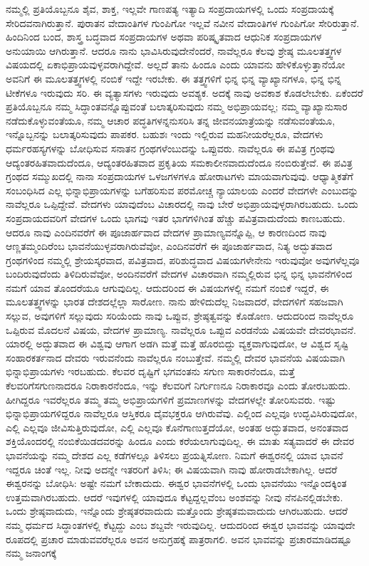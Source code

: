 ನಮ್ಮಲ್ಲಿ ಪ್ರತಿಯೊಬ್ಬನೂ ಶೈವ, ಶಾಕ್ತ, ಇಲ್ಲವೇ ಗಾಣಪತ್ಯ ಇತ್ಯಾದಿ ಸಂಪ್ರದಾಯಗಳಲ್ಲಿ ಒಂದು ಸಂಪ್ರದಾಯಕ್ಕೆ ಸೇರಿದವನಾಗಿರುತ್ತಾನೆ. ಪುರಾತನ ವೇದಾಂತಿಗಳ ಗುಂಪಿಗೋ ಇಲ್ಲವೆ ನವೀನ ವೇದಾಂತಿಗಳ ಗುಂಪಿಗೋ ಸೇರಿರುತ್ತಾನೆ. ಹಿಂದಿನಿಂದ ಬಂದ, ಶಾಸ್ತ್ರ ಬದ್ಧವಾದ ಸಂಪ್ರದಾಯಗಳ ಅಥವಾ ಪರಿಷ್ಕೃತವಾದ ಆಧುನಿಕ ಸಂಪ್ರದಾಯಗಳ ಅನುಯಾಯಿ ಆಗಿರುತ್ತಾನೆ. ಆದರೂ ನಾನು ಭಾವಿಸಿರುವುದೇನೆಂದರೆ, ನಾವೆಲ್ಲರೂ ಕೆಲವು ಶ್ರೇಷ್ಠ ಮೂಲತತ್ತ್ವಗಳ ವಿಷಯದಲ್ಲಿ ಏಕಾಭಿಪ್ರಾಯವುಳ್ಳವರಾಗಿದ್ದೇವೆ. ಅಲ್ಲದೆ ತಾನು ಹಿಂದೂ ಎಂದು ಯಾವನು ಹೇಳಿಕೊಳ್ಳುತ್ತಾನೆಯೋ ಅವನಿಗೆ ಈ ಮೂಲತತ್ತ್ವಗಳಲ್ಲಿ ನಂಬಿಕೆ ಇದ್ದೇ ಇರಬೇಕು. ಈ ತತ್ತ್ವಗಳಿಗೆ ಭಿನ್ನ ಭಿನ್ನ ವ್ಯಾಖ್ಯಾನಗಳೂ, ಭಿನ್ನ ಭಿನ್ನ ಟೀಕೆಗಳೂ ಇರುವುದು ಸರಿ. ಈ ವ್ಯತ್ಯಾಸಗಳು ಇರುವುದು ಅವಶ್ಯಕ. ಅದಕ್ಕೆ ನಾವು ಅವಕಾಶ ಕೊಡಲೇಬೇಕು. ಏಕೆಂದರೆ ಪ್ರತಿಯೊಬ್ಬನೂ ನಮ್ಮ ಸಿದ್ಧಾಂತವನ್ನೊಪ್ಪುವಂತೆ ಬಲಾತ್ಕರಿಸುವುದು ನಮ್ಮ ಅಭಿಪ್ರಾಯವಲ್ಲ; ನಮ್ಮ ವ್ಯಾಖ್ಯಾನುಸಾರ ನಡೆದುಕೊಳ್ಳುವಂತೆಯೂ, ನಮ್ಮ ಆಚಾರ ಪದ್ಧತಿಗಳನ್ನನುಸರಿಸಿ ತನ್ನ ಜೀವನಯಾತ್ರೆಯನ್ನು ನಡೆಸುವಂತೆಯೂ, ಇನ್ನೊಬ್ಬನನ್ನು ಬಲಾತ್ಕರಿಸುವುದು ಪಾಪಕರ. ಬಹುಶಃ ಇಂದು ಇಲ್ಲಿರುವ ಮಹನೀಯರೆಲ್ಲರೂ, ವೇದಗಳು ಧರ್ಮರಹಸ್ಯಗಳನ್ನು ಬೋಧಿಸುವ ಸನಾತನ ಗ್ರಂಥಗಳೆಂಬುದನ್ನು ಒಪ್ಪುವರು. ನಾವೆಲ್ಲರೂ ಈ ಪವಿತ್ರ ಗ್ರಂಥವು ಆದ್ಯಂತರಹಿತವಾದುದೆಂದೂ, ಆದ್ಯಂತರಹಿತವಾದ ಪ್ರಕೃತಿಯ ಸಮಕಾಲೀನವಾದುದೆಂದೂ ನಂಬಿರುತ್ತೇವೆ. ಈ ಪವಿತ್ರ ಗ್ರಂಥದ ಸಮ್ಮುಖದಲ್ಲಿ ನಾನಾ ಸಂಪ್ರದಾಯಗಳ ಒಳಜಗಳಗಳೂ ಹೋರಾಟಗಳು ಮಾಯವಾಗುವುವು. ಆಧ್ಯಾತ್ಮಿಕತೆಗೆ ಸಂಬಂಧಿಸಿದ ಎಲ್ಲ ಭಿನ್ನಾಭಿಪ್ರಾಯಗಳನ್ನು ಬಗೆಹರಿಸುವ ಪರಮೋಚ್ಚ ನ್ಯಾಯಾಲಯ ಎಂದರೆ ವೇದಗಳೇ ಎಂಬುದನ್ನು ನಾವೆಲ್ಲರೂ ಒಪ್ಪಿದ್ದೇವೆ. ವೇದಗಳು ಯಾವುದೆಂಬ ವಿಚಾರದಲ್ಲಿ ನಾವು ಬೇರೆ ಅಭಿಪ್ರಾಯವುಳ್ಳರಾಗಿರಬಹುದು. ಒಂದು ಸಂಪ್ರದಾಯದವರಿಗೆ ವೇದಗಳ ಒಂದು ಭಾಗವು ಇತರ ಭಾಗಗಳಿಗಿಂತ ಹೆಚ್ಚು ಪವಿತ್ರವಾದುದೆಂದು ಕಾಣಬಹುದು. ಆದರೂ ನಾವು ಎಂದಿನವರೆಗೆ ಈ ಪೂಜಾರ್ಹವಾದ ವೇದಗಳ ಪ್ರಾಮಾಣ್ಯವನ್ನೊಪ್ಪಿ, ಆ ಕಾರಣದಿಂದ ನಾವು ಆಣ್ಣತಮ್ಮಂದಿರೆಂಬ ಭಾವನೆಯುಳ್ಳವರಾಗಿರುವೆವೋ, ಎಂದಿನವರೆಗೆ ಈ ಪೂಜಾರ್ಹವಾದ, ನಿತ್ಯ ಅದ್ಭುತವಾದ ಗ್ರಂಥಗಳಿಂದ ನಮ್ಮಲ್ಲಿ ಶ್ರೇಯಸ್ಕರವಾದ, ಪವಿತ್ರವಾದ, ಪರಿಶುದ್ಧವಾದ ವಿಷಯಗಳೇನೇನು ಇರುವುವೋ ಅವುಗಳೆಲ್ಲವೂ ಬಂದಿರುವುದೆಂದು ತಿಳಿದಿರುವೆವೋ, ಅಂದಿನವರೆಗೆ ವೇದಗಳ ವಿಚಾರವಾಗಿ ನಮ್ಮಲ್ಲಿರುವ ಭಿನ್ನ ಭಿನ್ನ ಭಾವನೆಗಳಿಂದ ನಮಗೆ ಯಾವ ತೊಂದರೆಯೂ ಆಗುವುದಿಲ್ಲ. ಆದುದರಿಂದ ಈ ವಿಷಯಗಳಲ್ಲಿ ನಮಗೆ ನಂಬಿಕೆ ಇದ್ದರೆ, ಈ ಮೂಲತತ್ತ್ವಗಳನ್ನು ಭಾರತ ದೇಶದಲ್ಲೆಲ್ಲಾ ಸಾರೋಣ. ನಾನು ಹೇಳಿದುದೆಲ್ಲ ನಿಜವಾದರೆ, ವೇದಗಳಿಗೆ ಸಹಜವಾಗಿ ಸಲ್ಲುವ, ಅವುಗಳಿಗೆ ಸಲ್ಲುವುದು ಸರಿಯೆಂದು ನಾವು ಒಪ್ಪುವ, ಶ್ರೇಷ್ಠತ್ವವನ್ನು ಕೊಡೋಣ. ಆದುದರಿಂದ ನಾವೆಲ್ಲರೂ ಒಪ್ಪಿರುವ ಮೊದಲನೆ ವಿಷಯ, ವೇದಗಳ ಪ್ರಾಮಾಣ್ಯ. ನಾವೆಲ್ಲರೂ ಒಪ್ಪುವ ಎರಡನೆಯ ವಿಷಯವೇ ದೇವರಭಾವನೆ. ಯಾರಲ್ಲಿ ಅದ್ಭುತವಾದ ಈ ವಿಶ್ವವು ಆಗಾಗ ಅಡಗಿ ಮತ್ತೆ ಮತ್ತೆ ಹೊರಬಿದ್ದು ವ್ಯಕ್ತವಾಗುವುದೋ, ಆ ವಿಶ್ವದ ಸೃಷ್ಟಿ ಸಂಹಾರಕರ್ತನಾದ ದೇವರು ಇರುವನೆಂದು ನಾವೆಲ್ಲರೂ ನಂಬುತ್ತೇವೆ. ನಮ್ಮಲ್ಲಿ ದೇವರ ಭಾವನೆಯ ವಿಷಯವಾಗಿ ಭಿನ್ನಾಭಿಪ್ರಾಯಗಳು ಇರಬಹುದು. ಕೆಲವರ ದೃಷ್ಟಿಗೆ ಭಗವಂತನು ಸಗುಣ ಸಾಕಾರನೆಂದೂ, ಮತ್ತೆ ಕೆಲವರಿಗೆ\break ಸಗುಣನಾದರೂ ನಿರಾಕಾರನೆಂದೂ, ಇನ್ನು ಕೆಲವರಿಗೆ ನಿರ್ಗುಣನೂ ನಿರಾಕಾರವೂ ಎಂದು ತೋರಬಹುದು. ಹೀಗಿದ್ದರೂ ಇವರೆಲ್ಲರೂ ತಮ್ಮ ತಮ್ಮ ಅಭಿಪ್ರಾಯಗಳಿಗೆ ಪ್ರಮಾಣಗಳನ್ನು ವೇದಗಳಲ್ಲೇ ತೋರಿಸುವರು. ಇಷ್ಟು ಭಿನ್ನಾಭಿಪ್ರಾಯಗಳಿದ್ದರೂ ನಾವೆಲ್ಲರೂ ಆಸ್ತಿಕರೂ ದೈವಭಕ್ತರೂ ಆಗಿರುವೆವು. ಎಲ್ಲಿಂದ ಎಲ್ಲವೂ ಉದ್ಭವಿಸಿರುವುದೋ, ಎಲ್ಲಿ ಎಲ್ಲವೂ ಜೀವಿಸುತ್ತಿರುವುದೋ, ಎಲ್ಲಿ ಎಲ್ಲವೂ ಕೊನೆಗಾಣುತ್ತದೆಯೋ, ಅಂತಹ ಅದ್ಭುತವಾದ, ಅನಂತವಾದ ಶಕ್ತಿಯೊಂದರಲ್ಲಿ ನಂಬಿಕೆಯಿಡದವರನ್ನು ಹಿಂದೂ ಎಂದು ಕರೆಯಲಾಗುವುದಿಲ್ಲ. ಈ ಮಾತು ಸತ್ಯವಾದರೆ ಈ ದೇವರ ಭಾವನೆಯನ್ನು ನಮ್ಮ ದೇಶದ ಎಲ್ಲ ಕಡೆಗಳಲ್ಲೂ ತಿಳಿಸಲು ಪ್ರಯತ್ನಿಸೋಣ. ನಿಮಗೆ ಈಶ್ವರನಲ್ಲಿ ಯಾವ ಭಾವನೆ ಇದ್ದರೂ ಚಿಂತೆ ಇಲ್ಲ. ನೀವು ಅದನ್ನೇ ಇತರರಿಗೆ ತಿಳಿಸಿ; ಈ ವಿಷಯವಾಗಿ ನಾವು ಹೋರಾಡಬೇಕಾಗಿಲ್ಲ. ಆದರೆ ಈಶ್ವರನನ್ನು ಬೋಧಿಸಿ: ಅಷ್ಟೇ ನಮಗೆ ಬೇಕಾದುದು. ಈಶ್ವರ ಭಾವನೆಗಳಲ್ಲಿ ಒಂದು ಭಾವನೆಯು ಇನ್ನೊಂದಕ್ಕಿಂತ ಉತ್ತಮವಾಗಿರಬಹುದು. ಆದರೆ ಇವುಗಳಲ್ಲಿ ಯಾವುದೂ ಕೆಟ್ಟದ್ದಲ್ಲವೆಂಬ ಅಂಶವನ್ನು ನೀವು ನೆನಪಿನಲ್ಲಿಡಬೇಕು. ಒಂದು ಶ್ರೇಷ್ಠವಾದುದು, ಇನ್ನೊಂದು ಶ್ರೇಷ್ಠತರವಾದುದು ಮತ್ತೊಂದು ಶ್ರೇಷ್ಠತಮವಾದುದು ಆಗಿರಬಹುದು. ಆದರೆ ನಮ್ಮ ಧರ್ಮದ ಸಿದ್ಧಾಂತಗಳಲ್ಲಿ ಕೆಟ್ಟದ್ದು ಎಂಬ ಶಬ್ದವೇ ಇರುವುದಿಲ್ಲ. ಆದುದರಿಂದ ಈಶ್ವರ ಭಾವವನ್ನು ಯಾವುದೇ ರೂಪದಲ್ಲಿ ಪ್ರಚಾರ ಮಾಡುವವರೆಲ್ಲರೂ ಅವನ ಅನುಗ್ರಹಕ್ಕೆ ಪಾತ್ರರಾಗಲಿ. ಅವನ ಭಾವವನ್ನು ಪ್ರಚಾರಮಾಡಿದಷ್ಟೂ ನಮ್ಮ ಜನಾಂಗಕ್ಕೆ 